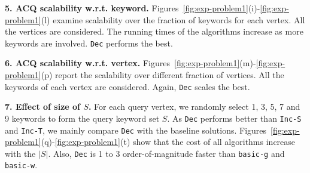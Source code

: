 \textbf{5. ACQ scalability w.r.t. keyword.}
Figures~\ref{fig:exp-problem1}(i)-\ref{fig:exp-problem1}(l) examine scalability over the fraction of keywords for each vertex. All the vertices are considered. The running times of the algorithms increase as more keywords are involved. {\tt Dec} performs the best.

\textbf{6. ACQ scalability w.r.t. vertex.}
Figures~\ref{fig:exp-problem1}(m)-\ref{fig:exp-problem1}(p) report the scalability over different fraction of vertices.
All the keywords of each vertex are considered. Again, {\tt Dec} scales the best.

\textbf{7. Effect of size of $S$.}
For each query vertex, we randomly select 1, 3, 5, 7 and 9 keywords to form the query keyword set $S$.
As {\tt Dec} performs better than {\tt Inc-S} and {\tt Inc-T}, we mainly compare {\tt Dec} with the baseline solutions. Figures~\ref{fig:exp-problem1}(q)-\ref{fig:exp-problem1}(t) show that the cost of all algorithms increase with the $|S|$. Also, {\tt Dec} is 1 to 3 order-of-magnitude faster than {\tt basic-g} and {\tt basic-w}.

